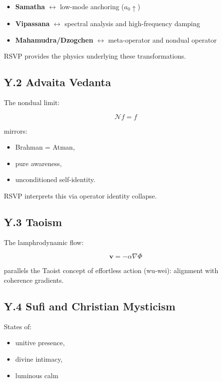 \documentclass[12pt]{article}
\begin{document}
\begin{itemize}
\item \textbf{Samatha} $\leftrightarrow$ low-mode anchoring ($a_0 \uparrow$)
\item \textbf{Vipassana} $\leftrightarrow$ spectral analysis and high-frequency damping
\item \textbf{Mahamudra/Dzogchen} $\leftrightarrow$ meta-operator and nondual operator
\end{itemize}

RSVP provides the physics underlying these transformations.

\subsection*{Y.2 Advaita Vedanta}

The nondual limit:

\[
\mathcal{N}f = f
\]

mirrors:

\begin{itemize}
\item Brahman = Atman,
\item pure awareness,
\item unconditioned self-identity.
\end{itemize}

RSVP interprets this via operator identity collapse.

\subsection*{Y.3 Taoism}

The lamphrodynamic flow:

\[
\mathbf{v} = -\alpha \nabla\Phi
\]

parallels the Taoist concept of effortless action (wu-wei): alignment with
coherence gradients.

\subsection*{Y.4 Sufi and Christian Mysticism}

States of:

\begin{itemize}
\item unitive presence,
\item divine intimacy,
\item luminous calm
\end{itemize}
\end{document}
